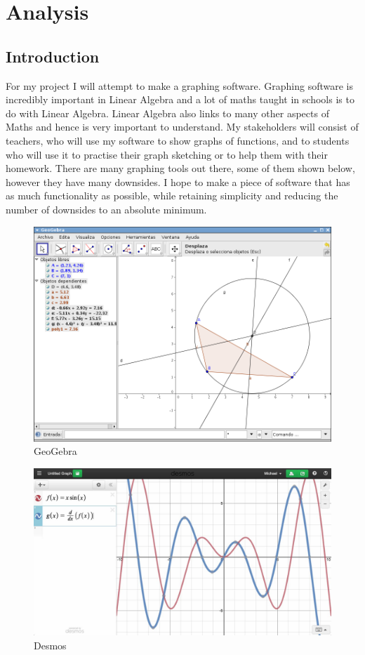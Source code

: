 \documentclass[../../main.tex]{subfiles}
\begin{document}
\part{Analysis}
\chapter{Introduction}
For my project I will attempt to make a graphing software. Graphing software is incredibly important in Linear Algebra and a lot of maths taught in schools is to do with Linear Algebra. Linear Algebra also links to many other aspects of Maths and hence is very important to understand. My stakeholders will consist of teachers, who will use my software to show graphs of functions, and to students who will use it to practise their graph sketching or to help them with their homework. There are many graphing tools out there, some of them shown below, however they have many downsides. I hope to make a piece of software that has as much functionality as possible, while retaining simplicity and reducing the number of downsides to an absolute minimum.
\begin{figure}[H]
	\centering
	\includegraphics[width=.4\textwidth]{geogebraEx}
	\caption{GeoGebra}
\end{figure}
\begin{figure}[H]
	\centering
	\includegraphics[width=.4\textwidth]{desmosEx}
	\caption{Desmos}
\end{figure}
\newpage
\end{document}
